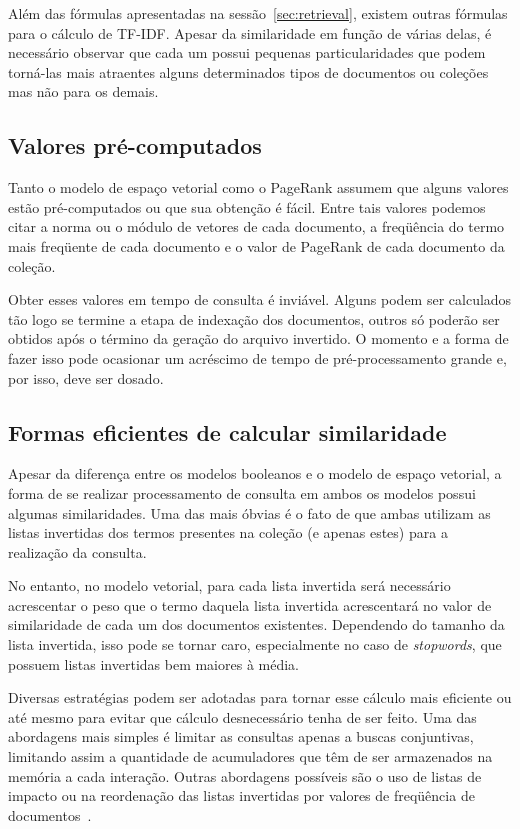 \documentclass[10pt,twocolumn]{article}
\begin{document}
Além das fórmulas apresentadas na sessão~\ref{sec:retrieval}, existem
outras fórmulas para o cálculo de TF-IDF. Apesar da similaridade em
função de várias delas, é necessário observar que cada um possui
pequenas particularidades que podem torná-las mais atraentes alguns
determinados tipos de documentos ou coleções mas não para os demais.

\subsection{Valores pré-computados}

Tanto o modelo de espaço vetorial como o PageRank assumem que alguns
valores estão pré-computados ou que sua obtenção é fácil. Entre tais
valores podemos citar a norma ou o módulo de vetores de cada documento,
a freqüência do termo mais freqüente de cada documento e o valor de
PageRank de cada documento da coleção.

Obter esses valores em tempo de consulta é inviável. Alguns podem ser
calculados tão logo se termine a etapa de indexação dos
documentos, outros só poderão ser obtidos após o término da geração do
arquivo invertido. O momento e a forma de fazer isso pode ocasionar um
acréscimo de tempo de pré-processamento grande e, por isso, deve ser
dosado.

\subsection{Formas eficientes de calcular similaridade}

Apesar da diferença entre os modelos booleanos e o modelo de espaço
vetorial, a forma de se realizar processamento de consulta em ambos os
modelos possui algumas similaridades. Uma das mais óbvias é o fato de
que ambas utilizam as listas invertidas dos termos presentes na coleção
(e apenas estes) para a realização da consulta.

No entanto, no modelo vetorial, para cada lista invertida será
necessário acrescentar o peso que o termo daquela lista invertida
acrescentará no valor de similaridade de cada um dos documentos
existentes. Dependendo do tamanho da lista invertida, isso pode se
tornar caro, especialmente no caso de \emph{stopwords}, que possuem
listas invertidas bem maiores à média.

Diversas estratégias podem ser adotadas para tornar esse cálculo mais
eficiente ou até mesmo para evitar que cálculo desnecessário tenha de
ser feito. Uma das abordagens mais simples é limitar as consultas apenas
a buscas conjuntivas, limitando assim a quantidade de acumuladores que
têm de ser armazenados na memória a cada interação. Outras abordagens
possíveis são o uso de listas de impacto ou na reordenação das
listas invertidas por valores de freqüência de
documentos~\cite{moffat1999managing, persin1996frequency}.
\end{document}
